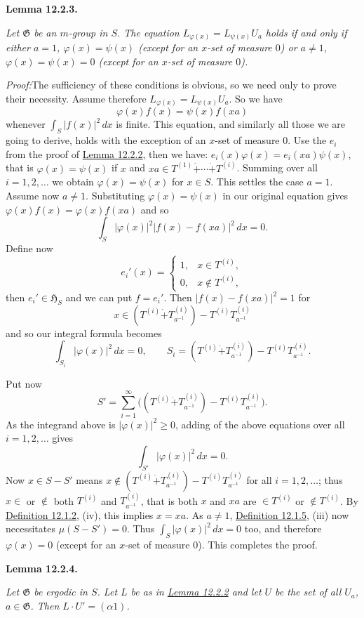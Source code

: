 \documentclass[12pt,b5paper,twoside]{article}
\newcommand{\Hspace}{\mathfrak H}
\newcommand{\Lemma}[1]{%
  \par\smallskip\noindent\phantomsection\label{lem:#1}\textbf{Lemma #1.}\enspace
}
\newcommand{\Proof}{\par\noindent\textit{Proof:}\enspace}
\newcommand{\defref}[1]{\hyperref[def:#1]{Definition #1}}
\newcommand{\lemref}[1]{\hyperref[lem:#1]{Lemma #1}}
\begin{document}
\Lemma{12.2.3}
\emph{Let $\mathfrak G$ be an $m$-group in $S$. The equation
$L_{\varphi(x)}=L_{\psi(x)}U_a$ holds if and only if either $a=1$,
$\varphi(x)=\psi(x)$ (except for an $x$-set of measure $0$) or $a\neq1$,
$\varphi(x)=\psi(x)=0$ (except for an $x$-set of measure $0$).}

\Proof The sufficiency of these conditions is obvious, so we need only to prove
their necessity. Assume therefore $L_{\varphi(x)}=L_{\psi(x)}U_a$. So we
have
\[
 \varphi(x)f(x)=\psi(x)f(xa)
\]
whenever $\int_S|f(x)|^2\,dx$ is finite. This equation, and similarly all
those we are going to derive, holds with the exception of an $x$-set of measure
$0$. Use the $e_i$ from the proof of \lemref{12.2.2}, then we have:
$e_i(x)\varphi(x)=e_i(xa)\psi(x)$, that is $\varphi(x)=\psi(x)$ if $x$ and
$xa\in T^{(1)}\mathbin{\dot+}\cdots\mathbin{\dot+}T^{(i)}$. Summing over all
$i=1,2,\ldots$ we obtain $\varphi(x)=\psi(x)$ for $x\in S$. This settles the
case $a=1$. Assume now $a\neq1$. Substituting $\varphi(x)=\psi(x)$ in our
original equation gives $\varphi(x)f(x)=\varphi(x)f(xa)$ and so
\[
 \int_S|\varphi(x)|^2|f(x)-f(xa)|^2\,dx=0.
\]
Define now
\[
 e_i'(x)=\begin{cases}
  1,&x\in T^{(i)},\\
  0,&x\notin T^{(i)},
 \end{cases}
\]
then $e_i'\in\Hspace_S$ and we can put $f=e_i'$. Then
$|f(x)-f(xa)|^2=1$ for
\[
 x\in(T^{(i)}\mathbin{\dot+}T_{a^{-1}}^{(i)})
       -T^{(i)}T_{a^{-1}}^{(i)}
\]
and so our integral formula becomes
\[
 \int_{S_i}|\varphi(x)|^2\,dx=0,
 \qquad
 S_i=(T^{(i)}\mathbin{\dot+}T_{a^{-1}}^{(i)})
       -T^{(i)}T_{a^{-1}}^{(i)}.
\]

Put now
\[
 S'=\sum_{i=1}^\infty
 \bigl((T^{(i)}\mathbin{\dot+}T_{a^{-1}}^{(i)})
       -T^{(i)}T_{a^{-1}}^{(i)}\bigr).
\]
As the integrand above is $|\varphi(x)|^2\geq0$, adding of the above equations
over all $i=1,2,\ldots$ gives
\[
 \int_{S'}|\varphi(x)|^2\,dx=0.
\]
Now $x\in S-S'$ means
$x\notin(T^{(i)}\mathbin{\dot+}T_{a^{-1}}^{(i)})
-T^{(i)}T_{a^{-1}}^{(i)}$ for all $i=1,2,\ldots$; thus $x\in$ or $\notin$
both $T^{(i)}$ and $T_{a^{-1}}^{(i)}$, that is both $x$ and $xa$ are
$\in T^{(i)}$ or $\notin T^{(i)}$. By \defref{12.1.2}, (iv), this implies
$x=xa$. As $a\neq1$, \defref{12.1.5}, (iii) now necessitates
$\mu(S-S')=0$. Thus $\int_S|\varphi(x)|^2\,dx=0$ too, and therefore
$\varphi(x)=0$ (except for an $x$-set of measure $0$). This completes the
proof.

\Lemma{12.2.4}
\emph{Let $\mathfrak G$ be ergodic in $S$. Let $L$ be as in
\lemref{12.2.2} and let $U$ be the set of all $U_a$, $a\in\mathfrak G$. Then
$L\cdot U'=(\alpha1)$.}
\end{document}

